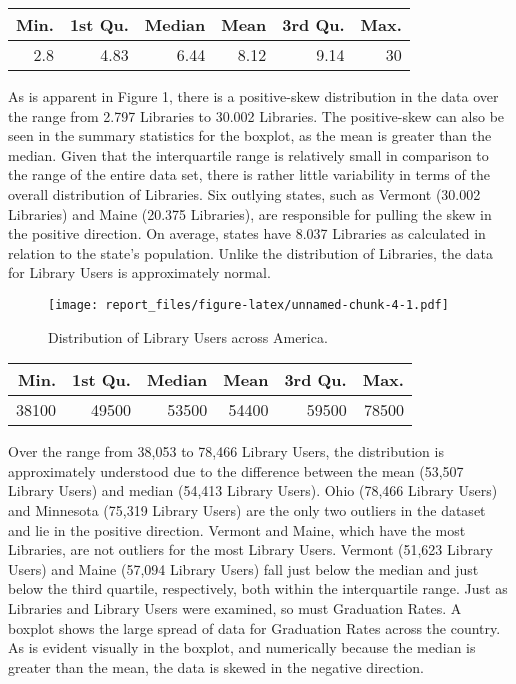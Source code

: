 \documentclass[12pt,]{article}
\begin{document}
\begin{longtable}[]{@{}rrrrrr@{}}
\toprule
Min. & 1st Qu. & Median & Mean & 3rd Qu. & Max.\tabularnewline
\midrule
\endhead
2.8 & 4.83 & 6.44 & 8.12 & 9.14 & 30\tabularnewline
\bottomrule
\end{longtable}

\vspace{10pt}

As is apparent in Figure 1, there is a positive-skew distribution in the
data over the range from 2.797 Libraries to 30.002 Libraries. The
positive-skew can also be seen in the summary statistics for the
boxplot, as the mean is greater than the median. Given that the
interquartile range is relatively small in comparison to the range of
the entire data set, there is rather little variability in terms of the
overall distribution of Libraries. Six outlying states, such as Vermont
(30.002 Libraries) and Maine (20.375 Libraries), are responsible for
pulling the skew in the positive direction. On average, states have
8.037 Libraries as calculated in relation to the state's population.
\newpage
Unlike the distribution of Libraries, the data for Library Users is
approximately normal.

\vspace{20pt}

\begin{figure}[htbp]
\centering
\texttt{[image: report\_files/figure-latex/unnamed-chunk-4-1.pdf]}
\caption{Distribution of Library Users across America.}
\end{figure}

\begin{longtable}[]{@{}rrrrrr@{}}
\toprule
Min. & 1st Qu. & Median & Mean & 3rd Qu. & Max.\tabularnewline
\midrule
\endhead
38100 & 49500 & 53500 & 54400 & 59500 & 78500\tabularnewline
\bottomrule
\end{longtable}

\vspace{0pt}

Over the range from 38,053 to 78,466 Library Users, the distribution is
approximately understood due to the difference between the mean (53,507
Library Users) and median (54,413 Library Users). Ohio (78,466 Library
Users) and Minnesota (75,319 Library Users) are the only two outliers in
the dataset and lie in the positive direction. Vermont and Maine, which
have the most Libraries, are not outliers for the most Library Users.
Vermont (51,623 Library Users) and Maine (57,094 Library Users) fall
just below the median and just below the third quartile, respectively,
both within the interquartile range. \newpage
Just as Libraries and Library Users were examined, so must Graduation
Rates. A boxplot shows the large spread of data for Graduation Rates
across the country. As is evident visually in the boxplot, and
numerically because the median is greater than the mean, the data is
skewed in the negative direction.
\end{document}
